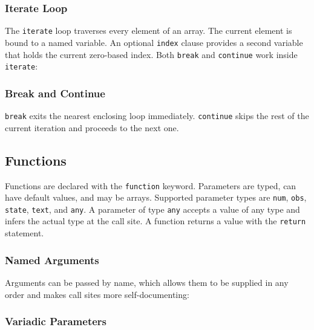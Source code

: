 

\subsubsection{Iterate Loop}

The \texttt{iterate} loop traverses every element of an array. The current
element is bound to a named variable.
An optional \texttt{index} clause provides a second variable that holds
the current zero-based index. Both \texttt{break} and \texttt{continue}
work inside \texttt{iterate}:



\subsubsection{Break and Continue}

\texttt{break} exits the nearest enclosing loop immediately.
\texttt{continue} skips the rest of the current iteration and proceeds to
the next one.


\subsection{Functions}\label{sec:functions}

Functions are declared with the \texttt{function} keyword. Parameters are
typed, can have default values, and may be arrays. Supported parameter types
are \texttt{num}, \texttt{obs}, \texttt{state}, \texttt{text}, and
\texttt{any}. A parameter of type \texttt{any} accepts a value of any type
and infers the actual type at the call site. A function returns a value
with the \texttt{return} statement.



\subsubsection{Named Arguments}

Arguments can be passed by name, which allows them to be supplied in any
order and makes call sites more self-documenting:



\subsubsection{Variadic Parameters}

